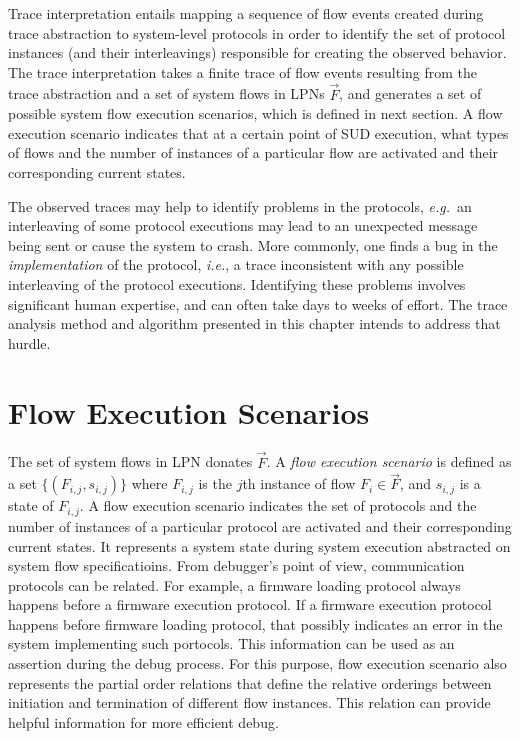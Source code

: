 \documentclass[12pt,frontmatter,copyright,thesis]{usfmanus}
\newcommand{\eg}{\mbox{{\em e.g.}}}
\newcommand{\ie}{\mbox{{\em i.e.}}}
\begin{document}
Trace interpretation entails mapping a sequence of flow events created
during trace abstraction to system-level protocols in order
to identify the set of protocol instances (and their
interleavings) responsible for creating the observed
behavior. The trace interpretation takes a finite trace of flow events
 resulting from the trace abstraction and a set of system
 flows in LPNs $\vec{F}$, and generates a set of possible
 system flow execution scenarios, which is defined in next section.
   A flow execution scenario
 indicates that at a certain point of SUD execution, what
 types of flows and the number of instances of a particular
 flow are activated and their corresponding current states.

The observed traces may help to identify problems in the protocols, 
\eg~an interleaving of some protocol executions
may lead to an unexpected message being sent or cause the
system to crash.  More commonly, one finds a bug in the {\em
  implementation} of the protocol, \ie, a trace inconsistent
with any possible interleaving of the protocol executions.
Identifying these problems involves significant human
expertise, and can often take days to weeks of effort.
The trace analysis method and algorithm presented in this chapter intends to
address that hurdle.



\section{Flow Execution Scenarios}
 The set
of system flows in LPN donates ${\vec{F}}$.  
A {\em flow execution scenario} is defined as a
set $\{(F_{i,j}, s_{i,j})\}$ where $F_{i,j}$ is the
$j$th instance of flow $F_i \in {\vec{F}}$, and $s_{i,j}$ is
a state of $F_{i,j}$.  
A flow execution scenario indicates
the set of protocols and the number of instances of a
particular protocol are activated and their corresponding
current states. 
It represents a system state 
during system execution abstracted on system flow specificatioins.
From debugger's point of view, communication
protocols can be related. For example, a firmware loading
protocol
always happens before a firmware execution protocol.
If a firmware execution protocol happens before firmware loading
protocol, that possibly indicates an error in the system
implementing such portocols.
This information
can be used as an assertion during the debug process.
For this purpose, flow execution scenario also
represents the partial order relations
that define the relative orderings 
between initiation and termination of different flow instances.
This relation can provide helpful information for more
efficient debug.
\end{document}
